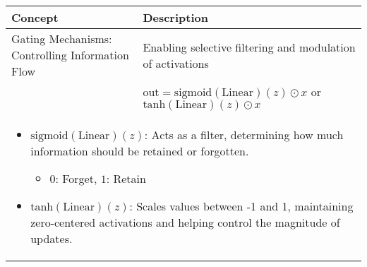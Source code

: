 \begin{summary}
    \begin{center}
        \begin{tabular}{ll}
            \toprule
            \textbf{Concept} & \textbf{Description} \\
            \toprule
            Gating Mechanisms: Controlling Information Flow & Enabling selective filtering and modulation of activations \\
            & $\text{out} = \text{sigmoid}(\text{Linear})(z) \odot x$ or $\text{tanh}(\text{Linear})(z) \odot x$ \\
            \multicolumn{2}{p{\linewidth}}{
            \begin{itemize}
                \item $\text{sigmoid}(\text{Linear})(z)$: Acts as a filter, determining how much information should be retained or forgotten.
                \begin{itemize}
                    \item $0$: Forget, $1$: Retain
                \end{itemize}
                \item $\text{tanh}(\text{Linear})(z)$: Scales values between -1 and 1, maintaining zero-centered activations and helping control the magnitude of updates.
            \end{itemize}} \\
            \bottomrule
        \end{tabular}
    \end{center}
\end{summary}

